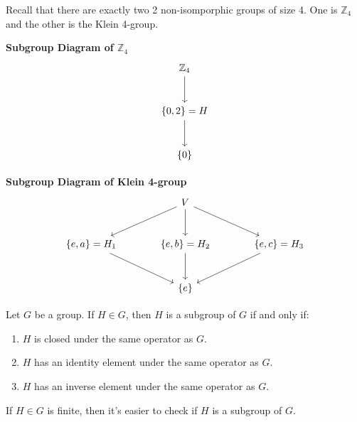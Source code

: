 \begin{prev}
    Recall that there are exactly two 2 non-isomporphic groups of size 4. One is $\mathbb{Z}_4$ and the other is the Klein 4-group.
\end{prev}

\begin{note}
    \begin{minipage}{0.45\textwidth}
    \centering
    \textbf{Subgroup Diagram of $ \mathbb{Z}_4 $}
    \[
    \begin{tikzcd}[row sep=large]
        & \mathbb{Z}_4 \arrow[d] & \\
        & \{0,2\}=H \arrow[d] & \\
        & \{0\} &
    \end{tikzcd}
    \]
    \end{minipage}%
    \hfill
    \begin{minipage}{0.45\textwidth}
    \centering
    \textbf{Subgroup Diagram of Klein 4-group}
    \[
    \begin{tikzcd}[row sep=large, column sep=large]
        & V \arrow[ld] \arrow[d] \arrow[rd] & \\
        \{e, a\}=H_1 \arrow[rd] & \{e, b\}=H_2 \arrow[d] & \{e, c\}=H_3 \arrow[ld] \\
        & \{e\} &
    \end{tikzcd}
    \]
    \end{minipage}
\end{note}

\begin{theorem}
    Let $G$ be a group. If $H \in G$,  then $H$ is a subgroup of $G$ if and only if:
    \begin{enumerate}
        \item $H$ is closed under the same operator as $G$.
        \item $H$ has an identity element under the same operator as $G$.
        \item $H$ has an inverse element under the same operator as $G$.
    \end{enumerate}
\end{theorem}

\begin{remark}
    If $H \in G$ is finite, then it's easier to check if $H$ is a subgroup of $G$.
\end{remark}

